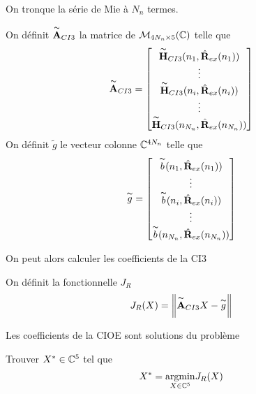     On tronque la série de Mie à \(N_{n}\) termes.
    \begin{defn}
      On définit \(\overset{\thicksim}{\mathbf{A}}_{CI3}\) la matrice de \(\mathcal{M}_{4N_{n}\times5}(\mathbb C)\) telle que
      \begin{equation*}
        \overset{\thicksim}{\mathbf{A}}_{CI3} = 
        \begin{bmatrix}
          \overset{\thicksim}{\mathbf{H}}_{CI3}(n_1,\hat{\mathbf{R}}_{ex}(n_1))
          \\
          \vdots
          \\
          \overset{\thicksim}{\mathbf{H}}_{CI3}(n_i,\hat{\mathbf{R}}_{ex}(n_i))
          \\
          \vdots
          \\
          \overset{\thicksim}{\mathbf{H}}_{CI3}(n_{N_n},\hat{\mathbf{R}}_{ex}(n_{N_n}))
        \end{bmatrix}
      \end{equation*}
      On définit \(\tilde{g}\) le vecteur colonne \(\mathbb C^{4N_{n}}\) telle que
      \begin{equation*}
        \overset{\thicksim}{g} = 
        \begin{bmatrix}
          \overset{\thicksim}{b}(n_1,\hat{\mathbf{R}}_{ex}(n_1))
          \\
          \vdots
          \\
          \overset{\thicksim}{b}(n_i,\hat{\mathbf{R}}_{ex}(n_i))
          \\
          \vdots
          \\
          \overset{\thicksim}{b}(n_{N_n},\hat{\mathbf{R}}_{ex}(n_{N_n}))
        \end{bmatrix}
      \end{equation*}
    \end{defn}

    On peut alors calculer les coefficients de la CI3

    \begin{defn}
      On définit la fonctionnelle \(J_R\)
      \begin{equation*}
        J_R(X) = \left\lVert\overset{\thicksim}{\mathbf{A}}_{CI3}X - \overset{\thicksim}{g}\right\rVert
      \end{equation*}
    \end{defn}

    \begin{thm}

      Les coefficients de la CIOE sont solutions du problème

      Trouver \(X^* \in \mathbb C^5\) tel que
      \begin{equation*}
        X^* = {\underset{X\in \mathbb C^5}{\operatorname{argmin}}} J_R(X)
      \end{equation*}
    \end{thm}

